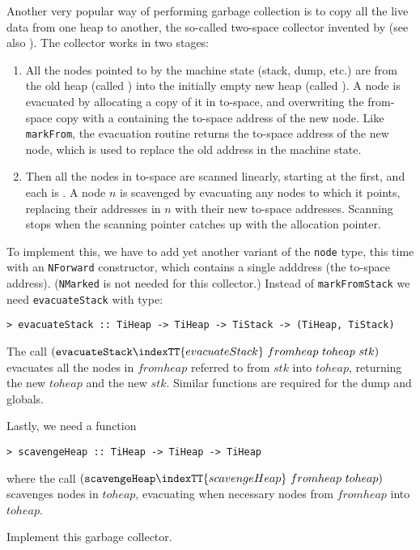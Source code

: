 Another very popular way of performing garbage collection is
to copy all the live data from one heap to another, the so-called
two-space collector invented by \cite{Fenichel} (see also
\cite{Baker,Cheney}). The collector works in two stages:
\begin{enumerate}
\item
All the nodes pointed to by the machine state (stack, dump, etc.)
are  from the old heap (called ) into
the initially empty new heap (called ).
A node is evacuated by allocating
a copy of it in to-space, and overwriting the from-space copy with a
 containing the to-space address of the new
node.
Like \mbox{\tt markFrom}, the
evacuation routine returns the to-space address of the new node, which
is used to replace the old address in the machine state.
\item
Then all the nodes in to-space are scanned linearly, starting at the first,
and each is .
A node $n$ is scavenged by evacuating any nodes
to which it points, replacing their addresses in $n$ with their new
to-space addresses.
Scanning stops when the scanning pointer catches up with the allocation
pointer.
\end{enumerate}

To implement this, we have to add yet another variant of the \mbox{\tt node} type,
this time with an \mbox{\tt NForward} constructor, which contains a single adddress
(the to-space address).  (\mbox{\tt NMarked} is not needed for this collector.)
Instead of \mbox{\tt markFromStack} we need \mbox{\tt evacuateStack} with type:
\begin{verbatim}
> evacuateStack :: TiHeap -> TiHeap -> TiStack -> (TiHeap, TiStack)
\end{verbatim}
%
\par
The call $(\mbox{\tt evacuateStack}\indexTT{evacuateStack}~fromheap~toheap~stk)$ evacuates all the
nodes in $fromheap$ referred to from $stk$ into $toheap$, returning
the new $toheap$ and the new $stk$.  Similar functions are required for
the dump and globals.

Lastly, we need a function
\begin{verbatim}
> scavengeHeap :: TiHeap -> TiHeap -> TiHeap
\end{verbatim}
%
where the call $(\mbox{\tt scavengeHeap}\indexTT{scavengeHeap}~fromheap~toheap)$ scavenges nodes in
$toheap$, evacuating when necessary nodes from $fromheap$ into $toheap$.

\begin{exercise}
Implement this garbage collector.
\end{exercise}

